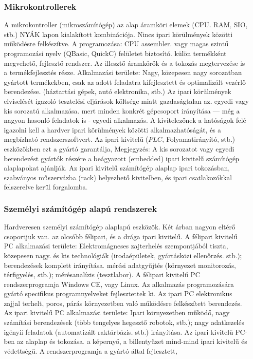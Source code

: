 \documentclass[11pt,a4paper]{article}
\begin{document}
\subsubsection{Mikrokontrollerek}
A mikrokontroller (mikroszámítógép) az alap áramköri elemek (CPU. RAM, SIO, stb.) NYÁK lapon kialakított kombinációja. Nincs ipari körülmények közötti működésre felkészítve. A programozása: CPU assembler. vagy magas szintű programozási nyelv (QBasic, QuickC) felületet biztosító. külön termékként megvehető, fejlesztő rendszer. Az illesztő áramkörök és a tokozás megtervezése is a termékfejlesztés része.
Alkalmazási területe: Nagy, közepesen nagy sorozatban gyártott termékekben, csak az adott feladatra kifejlesztett és optimalizált vezérlő berendezése. (háztartási gépek, autó elektronika, stb.)
Az ipari körülmények elviselését igazoló tesztelési eljárások költsége miatt gazdaságtalan az. egyedi vagy kis sorozatú alkalmazása. mert minden konkrét gépcsoport irányítása — még a nagyon hasonló feladatok is - egyedi alkalmazás. A kivitelezőnek a hatóságok felé igazolni kell a hardver ipari körülmények közötti alkalmazhatóságát, és a megbízható rendszerszoftvert. Az ipari kivitelű ($PLC$, Folyamatirányító, stb.) eszközökben ezt a gyártó garantálja,
Megjegyzés: A kis sorozatot vagy egyedi berendezést gyártók részére a beágyazott (embedded) ipari kivitelű számítógép alaplapokat ajánlják. Az ipari kivitelű számítógép alaplap ipari tokozásban, szabványos műszervázba (rack) helyezhető kivitelben, és ipari csatlakozókkal felszerelve kerül forgalomba.

	\subsubsection{Személyi számítógép alapú rendszerek}
	Hardveresen személyi számítógép alaplapú eszközök. Két árban nagyon eltérő csoportjuk van. az olcsóbb félipari, és a drága ipari kivitelű.
A félipari kivitelű PC alkalmazási területe: Elektromágneses zajterhelés szempontjából tiszta, közepesen nagy. és kis technológiák (irodaépületek, gyártásközi ellenőrzés. stb.); berendezések komplett irányítása. mérési adatgyűjtés (környezet monitorozás, térfigyelés, stb.); mérésanalízis (tesztlabor). A félipari kivitelű PC rendszerprogramja Windows CE, vagy Linux. Az alkalmazás programozására gyártó specifikus programnyelveket fejlesztettek ki.
Az ipari PC elektronikus zajjal terhelt, poros, párás környezetben való működésre felkészített berendezés. Az ipari kivitelű PC alkalmazási területe: Ipari környezetben működő, nagy számítási berendezések (több tengelyes hegesztő robotok, stb.); nagy adatkezelés igényii feladatok (automatizált raktárbázis. stb.) irányítása. Az ipari kivitelű PC-ben az alaplap és tokozása. a képernyő, a billentyűzet mind-mind ipari kivitelű és védettségű. A rendszerprogramja a gyártó által fejlesztett, 
\end{document}
